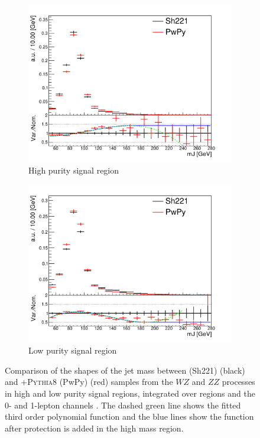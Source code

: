 \begin{figure}[!htbp]
  \centering
  \begin{subfigure}{.5\textwidth}
    \includegraphics[width=\textwidth]{chapters/6.vhbb_boosted/figs/01L_VV_2tag1pfat0jet_ptvinc_SR_noaddbjetsr_mJIncl_SysPwPy.pdf}
    \caption{High purity signal region}
    \label{fig:VV_PP8Fit_sub1}
  \end{subfigure}%
  \begin{subfigure}{.5\textwidth}
    \includegraphics[width=\textwidth]{chapters/6.vhbb_boosted/figs/01L_VV_2tag1pfat1pjet_ptvinc_SR_noaddbjetsr_mJIncl_SysPwPy.pdf}
    \caption{Low purity signal region}
    \label{fig:VV_PP8Fit_sub2}
  \end{subfigure}
  \caption{
    Comparison of the shapes of the \largeR jet mass \mJ between \SHERPA (Sh221) (black) and \POWHEG{}+\textsc{Pythia8} (PwPy) (red) samples from the $WZ$ and $ZZ$ processes in high and low purity signal regions, integrated over \pTV regions and the 0- and 1-lepton channels \cite{Dao:2688371}.
    The dashed green line shows the fitted third order polynomial function and the blue lines show the function after protection is added in the high mass region.
  }
  \label{fig:VV_PP8Fit}
\end{figure}



